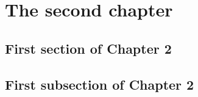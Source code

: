 \clearpage
\chapter{The second chapter}
\label{ch2_second_chapter}
\normalsize




\section{First section of Chapter 2}
    \label{ch2_section_first_section}







\section{First subsection of Chapter 2}
    \label{ch2_section_first_section_first_subsection}



